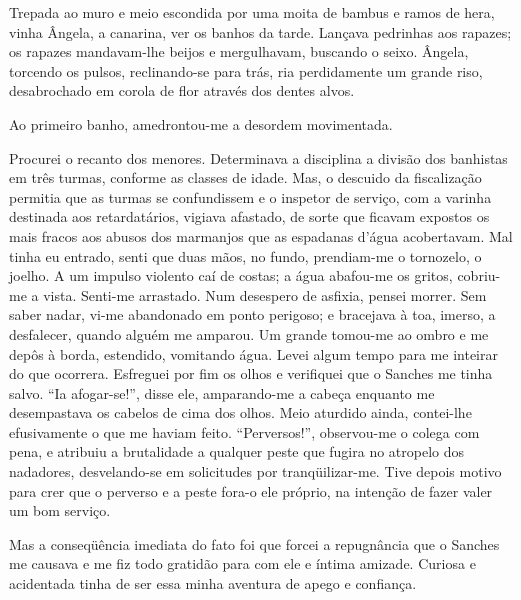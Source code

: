 Trepada ao muro e meio escondida por uma moita de bambus e ramos de hera, 
vinha Ângela, a canarina, ver os banhos da tarde. Lançava pedrinhas aos
rapazes; os rapazes mandavam{}-lhe beijos e mergulhavam, buscando o
seixo. Ângela, torcendo os pulsos, reclinando{}-se para trás, ria
perdidamente um grande riso, desabrochado em corola de flor através dos
dentes alvos. 

Ao primeiro banho, amedrontou{}-me a desordem movimentada. 

Procurei o recanto dos menores. Determinava a disciplina a
divisão dos banhistas em três turmas, conforme as classes de idade.
Mas, o descuido da fiscalização permitia que as turmas se confundissem
e o inspetor de serviço, com a varinha destinada aos retardatários,
vigiava afastado, de sorte que ficavam expostos os mais fracos aos
abusos dos marmanjos que as espadanas d'água acobertavam. Mal tinha eu
entrado, senti que duas mãos, no fundo, prendiam{}-me o tornozelo, o
joelho. A um impulso violento caí de costas; a água abafou{}-me os
gritos, cobriu{}-me a vista. Senti{}-me arrastado. Num desespero de
asfixia, pensei morrer. Sem saber nadar, vi{}-me abandonado em ponto
perigoso; e bracejava à toa, imerso, a desfalecer, quando alguém me
amparou. Um grande tomou{}-me ao ombro e me depôs à borda, estendido,
vomitando água. Levei algum tempo para me inteirar do que ocorrera.
Esfreguei por fim os olhos e verifiquei que o Sanches me tinha salvo.
``Ia afogar{}-se!'', disse ele, amparando{}-me a cabeça enquanto me
desempastava os cabelos de cima dos olhos. Meio aturdido ainda,
contei{}-lhe efusivamente o que me haviam feito. ``Perversos!'', 
observou{}-me o colega com pena, e atribuiu a brutalidade a qualquer
peste que fugira no atropelo dos nadadores, desvelando{}-se em
solicitudes por tranqüilizar{}-me. Tive depois motivo para crer que o
perverso e a peste fora{}-o ele próprio, na intenção de fazer valer um
bom serviço. 

Mas a conseqüência imediata do fato foi que forcei a
repugnância que o Sanches me causava e me fiz todo gratidão para com
ele e íntima amizade. Curiosa e acidentada tinha de ser essa minha
aventura de apego e confiança. 

